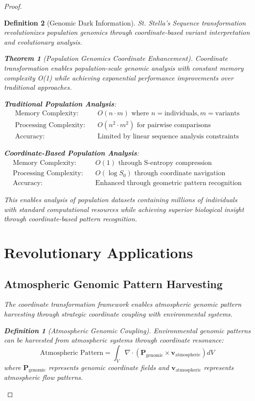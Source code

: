 \documentclass[12pt,a4paper]{article}
\newtheorem{theorem}{Theorem}
\newtheorem{definition}{Definition}
\begin{document}
\begin{proof}
\begin{definition}[Genomic Dark Information]
St. Stella's Sequence transformation revolutionizes population genomics through coordinate-based variant interpretation and evolutionary analysis.

\begin{theorem}[Population Genomics Coordinate Enhancement]
Coordinate transformation enables population-scale genomic analysis with constant memory complexity O(1) while achieving exponential performance improvements over traditional approaches.
\end{theorem}

\textbf{Traditional Population Analysis}:
\begin{align}
\text{Memory Complexity:} \quad &O(n \cdot m) \text{ where } n = \text{individuals}, m = \text{variants} \\
\text{Processing Complexity:} \quad &O(n^2 \cdot m^2) \text{ for pairwise comparisons} \\
\text{Accuracy:} \quad &\text{Limited by linear sequence analysis constraints}
\end{align}

\textbf{Coordinate-Based Population Analysis}:
\begin{align}
\text{Memory Complexity:} \quad &O(1) \text{ through S-entropy compression} \\
\text{Processing Complexity:} \quad &O(\log S_0) \text{ through coordinate navigation} \\
\text{Accuracy:} \quad &\text{Enhanced through geometric pattern recognition}
\end{align}

This enables analysis of population datasets containing millions of individuals with standard computational resources while achieving superior biological insight through coordinate-based pattern recognition.

\section{Revolutionary Applications}

\subsection{Atmospheric Genomic Pattern Harvesting}

The coordinate transformation framework enables atmospheric genomic pattern harvesting through strategic coordinate coupling with environmental systems.

\begin{definition}[Atmospheric Genomic Coupling]
Environmental genomic patterns can be harvested from atmospheric systems through coordinate resonance:
\begin{equation}
\text{Atmospheric Pattern} = \int_V \nabla \cdot (\mathbf{P}_{\text{genomic}} \times \mathbf{v}_{\text{atmospheric}}) dV
\end{equation}
where $\mathbf{P}_{\text{genomic}}$ represents genomic coordinate fields and $\mathbf{v}_{\text{atmospheric}}$ represents atmospheric flow patterns.
\end{definition}


\end{definition}
\end{proof}
\end{document}
